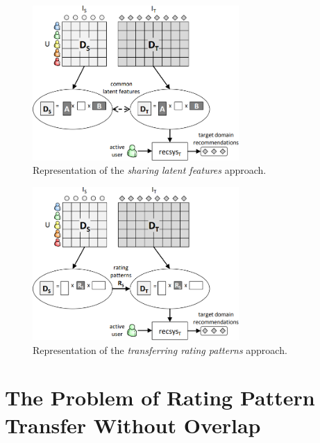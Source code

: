 \begin{figure}[hbt!]
\centering
\includegraphics[width=0.7\textwidth]{pictures/sharing-latent-features}
\caption{Representation of the \textit{sharing latent features} approach. \cite{10.1007/978-1-4899-7637-6_27}}
\label{fg:sharing-latent-features}
\end{figure}
\begin{figure}[hbt!]
\centering
\includegraphics[width=0.7\textwidth]{pictures/transferring-rating-patterns}
\caption{Representation of the \textit{transferring rating patterns} approach. \cite{10.1007/978-1-4899-7637-6_27}}
\label{fg:transferring-rating-patterns}
\end{figure}



\section{The Problem of Rating Pattern Transfer Without Overlap}

